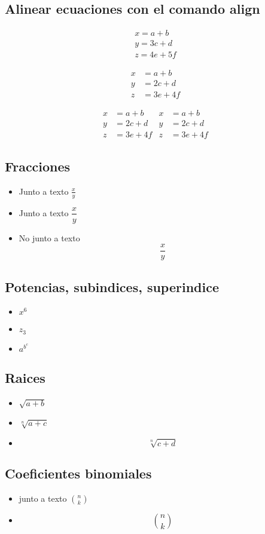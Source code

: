 \documentclass[12pt]{article}
\begin{document}
\subsection{Alinear ecuaciones con el comando align}
\begin{align}
x = a+b \\
y = 3c+d \\
z = 4e+5f
\end{align}

\begin{align*}
x &= a+b \\
y &= 2c+d \\
z &= 3e+4f
\end{align*}

\begin{align}
x &= a+b &  x &= a+b \nonumber \\
y &= 2c+d  & y &= 2c+d \\
z &= 3e+4f & z &= 3e+4f
\end{align}

\subsection{Fracciones}
\begin{itemize}
\item Junto a texto $ \frac{x}{y} $
\item Junto a texto $ \dfrac{x}{y} $
\item No junto a texto 
\[
\frac{x}{y}
\]

\end{itemize}

\subsection{Potencias, subindices, superindice}

\begin{itemize}
\item $ x^{6} $
\item $ z_{3}$
\item $ a^{b^{c}}$ 
\end{itemize}

\subsection{Raices}
\begin{itemize}
\item $ \sqrt{a+b}$
\item $ \sqrt[n]{a+c} $
\item \[   \sqrt[n]{c+d}   \]
\end{itemize}

\subsection{Coeficientes binomiales}

\begin{itemize}
\item junto a texto $\binom{n}{k} $
\item \[   \binom{n}{k}  \]

\end{itemize}
\end{document}
